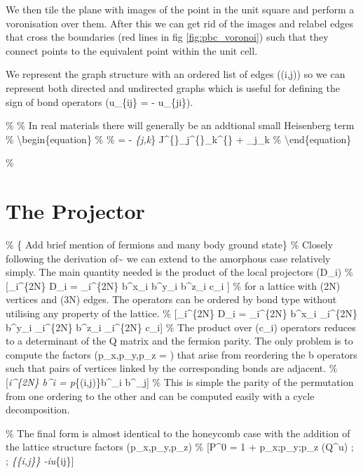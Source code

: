 We then tile the plane with images of the point in the unit square and
perform a voronisation over them. After this we can get rid of the
images and relabel edges that cross the boundaries (red lines in fig
\ref{fig:pbc_voronoi}) such that they connect points to the equivalent
point within the unit cell.

We represent the graph structure with an ordered list of edges ((i,j))
so we can represent both directed and undirected graphs which is useful
for defining the sign of bond operators (u\_\{ij\} = - u\_\{ji\}).

\%  \% In real materials there will
generally be an addtional small Heisenberg term \%
\textbackslash begin\{equation\} \% \label{eqn:kitaev_heisnberg} \%
 = - \sum\emph{\{\langle j,k\rangle}\alpha\}
J\^{}\{\alpha\}\sigma\_j\^{}\{\alpha\}\sigma\_k\^{}\{\alpha\} +
\sigma\_j\sigma\_k \% \textbackslash end\{equation\}

\%

\section{The Projector} \label{apx:projector}

\% \{\color{red} Add brief mention of fermions and many body ground
state\} \% Closely following the derivation
of\textasciitilde{}\cite{pedrocchiPhysicalSolutionsKitaev2011} we can
extend to the amorphous case relatively simply. The main quantity needed
is the product of the local projectors (D\_i) \% {[}\prod\_i\^{}\{2N\}
D\_i = \prod\_i\^{}\{2N\} b\^{}x\_i b\^{}y\_i b\^{}z\_i c\_i {]} \% for
a lattice with (2N) vertices and (3N) edges. The operators can be
ordered by bond type without utilising any property of the lattice. \%
{[}\prod\_i\^{}\{2N\} D\_i = \prod\_i\^{}\{2N\} b\^{}x\_i
\prod\_i\^{}\{2N\} b\^{}y\_i \prod\_i\^{}\{2N\} b\^{}z\_i
\prod\_i\^{}\{2N\} c\_i{]} \% The product over (c\_i) operators reduces
to a determinant of the Q matrix and the fermion parity. The only
problem is to compute the factors (p\_x,p\_y,p\_z = ) that arise
from reordering the b operators such that pairs of vertices linked by
the corresponding bonds are adjacent. \% {[}\prod\emph{i\^{}\{2N\}
b\^{}\alpha\emph{i = p}\alpha \prod}\{(i,j)\}b\^{}\alpha\_i
b\^{}\alpha\_j{]} \% This is simple the parity of the permutation from
one ordering to the other and can be computed easily with a cycle
decomposition.

\% The final form is almost identical to the honeycomb case with the
addition of the lattice structure factors (p\_x,p\_y,p\_z) \% {[}P\^{}0
= 1 + p\_x;p\_y;p\_z (Q\^{}u) ; \hat{\pi} ;
\prod\emph{\{\{i,j\}\} -iu}\{ij\}{]}

